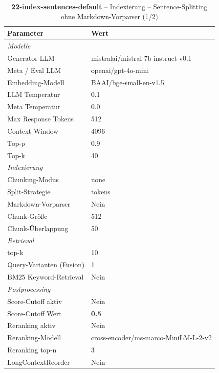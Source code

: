 \begin{table}[H]
\centering
\small
\setlength{\tabcolsep}{4pt}
\begin{tabular}{lp{8cm}}
\toprule
\textbf{Parameter} & \textbf{Wert} \\
\midrule
\multicolumn{2}{l}{\textit{Modelle}} \\
\midrule
\quad Generator LLM & mistralai/mistral-7b-instruct-v0.1 \\
\quad Meta / Eval LLM & openai/gpt-4o-mini \\
\quad Embedding-Modell & BAAI/bge-small-en-v1.5 \\
\quad LLM Temperatur & 0.1 \\
\quad Meta Temperatur & 0.0 \\
\quad Max Response Tokens & 512 \\
\quad Context Window & 4096 \\
\quad Top-p & 0.9 \\
\quad Top-k & 40 \\
\midrule
\multicolumn{2}{l}{\textit{Indexierung}} \\
\midrule
\quad Chunking-Modus & none \\
\quad Split-Strategie & tokens \\
\quad Markdown-Vorparser & Nein \\
\quad Chunk-Größe & 512 \\
\quad Chunk-Überlappung & 50 \\
\midrule
\multicolumn{2}{l}{\textit{Retrieval}} \\
\midrule
\quad top-k & 10 \\
\quad Query-Varianten (Fusion) & 1 \\
\quad BM25 Keyword-Retrieval & Nein \\
\midrule
\multicolumn{2}{l}{\textit{Postprocessing}} \\
\midrule
\quad Score-Cutoff aktiv & Nein \\
\quad Score-Cutoff Wert & \textbf{0.5} \\
\quad Reranking aktiv & Nein \\
\quad Reranking-Modell & cross-encoder/ms-marco-MiniLM-L-2-v2 \\
\quad Reranking top-n & 3 \\
\quad LongContextReorder & Nein \\
\bottomrule
\end{tabular}
\caption{\textbf{22-index-sentences-default} -- Indexierung -- Sentence-Splitting ohne Markdown-Vorparser (1/2)}
\label{tab:config_22_index_sentences_default_a}
\end{table}

